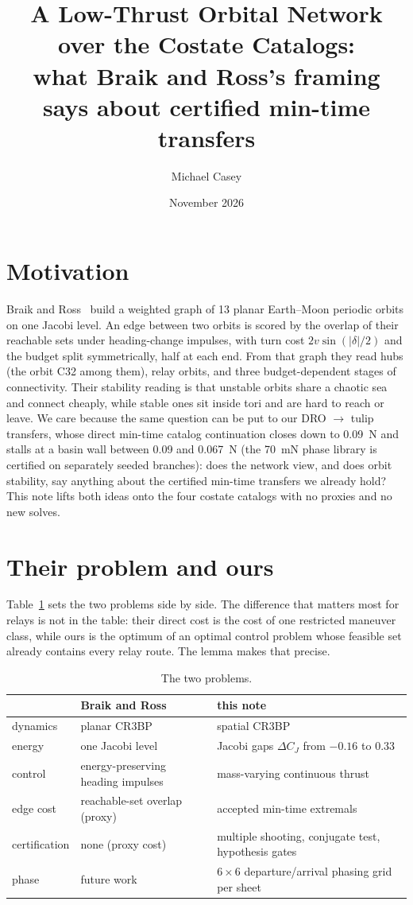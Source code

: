 \documentclass[11pt]{article}
\title{A Low-Thrust Orbital Network over the Costate Catalogs:\\ what Braik and Ross's framing says about certified min-time transfers}
\author{Michael Casey}
\date{November 2026}
\begin{document}
\maketitle

\section{Motivation}
Braik and Ross~\cite{braik2026} build a weighted graph of 13 planar Earth--Moon periodic orbits on
one Jacobi level. An edge between two orbits is scored by the overlap of their reachable sets under
heading-change impulses, with turn cost $2v\sin(|\delta|/2)$ and the budget split symmetrically,
half at each end. From that graph they read hubs (the orbit C32 among them), relay orbits, and three
budget-dependent stages of connectivity. Their stability reading is that unstable orbits share a
chaotic sea and connect cheaply, while stable ones sit inside tori and are hard to reach or leave.
We care because the same question can be put to our DRO $\to$ tulip transfers, whose direct
min-time catalog continuation closes down to 0.09~N and stalls at a basin wall between 0.09 and
0.067~N (the 70~mN phase library is certified on separately seeded branches): does the network view, and does orbit stability,
say anything about the certified min-time transfers we already hold? This note lifts both ideas onto
the four costate catalogs with no proxies and no new solves.

\section{Their problem and ours}
Table~\ref{tab:problems} sets the two problems side by side. The difference that matters most for
relays is not in the table: their direct cost is the cost of one restricted maneuver class, while
ours is the optimum of an optimal control problem whose feasible set already contains every relay
route. The lemma makes that precise.

\begin{table}[tbp]
\centering\small
\begin{tabular}{@{}lll@{}}
\toprule
 & Braik and Ross~\cite{braik2026} & this note \\
\midrule
dynamics & planar CR3BP & spatial CR3BP \\
energy & one Jacobi level & Jacobi gaps $\Delta C_J$ from $-0.16$ to $0.33$ \\
control & energy-preserving heading impulses & mass-varying continuous thrust \\
edge cost & reachable-set overlap (proxy) & accepted min-time extremals \\
certification & none (proxy cost) & multiple shooting, conjugate test, hypothesis gates \\
phase & future work & $6\times 6$ departure/arrival phasing grid per sheet \\
\bottomrule
\end{tabular}
\caption{The two problems.}
\label{tab:problems}
\end{table}
\end{document}
